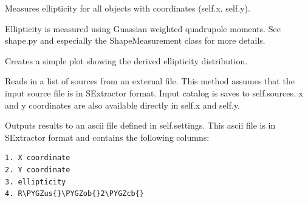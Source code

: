 \documentclass[a4paper,11pt,english]{sphinxmanual}
\def\PYGZus{\char`\_}
\def\PYGZob{\char`\{}
\def\PYGZcb{\char`\}}
\begin{document}
\begin{fulllineitems}
\begin{fulllineitems}
\end{fulllineitems}


\begin{fulllineitems}
\label{analysis:analysis.analyse.analyseVISdata.measureEllipticity}
Measures ellipticity for all objects with coordinates (self.x, self.y).

Ellipticity is measured using Guassian weighted quadrupole moments.
See shape.py and especially the ShapeMeasurement class for more details.

\end{fulllineitems}


\begin{fulllineitems}
\label{analysis:analysis.analyse.analyseVISdata.plotEllipticityDistribution}
Creates a simple plot showing the derived ellipticity distribution.

\end{fulllineitems}


\begin{fulllineitems}
\label{analysis:analysis.analyse.analyseVISdata.readSources}
Reads in a list of sources from an external file. This method assumes
that the input source file is in SExtractor format. Input catalog is
saves to self.sources. x and y coordinates are also available directly in self.x and self.y.

\end{fulllineitems}


\begin{fulllineitems}
\label{analysis:analysis.analyse.analyseVISdata.writeResults}
Outputs results to an ascii file defined in self.settings. This ascii file
is in SExtractor format and contains the following columns:

\begin{Verbatim}[commandchars=\\\{\}]
1. X coordinate
2. Y coordinate
3. ellipticity
4. R\PYGZus{}\PYGZob{}2\PYGZcb{}
\end{Verbatim}

\end{fulllineitems}


\end{fulllineitems}
\end{document}

